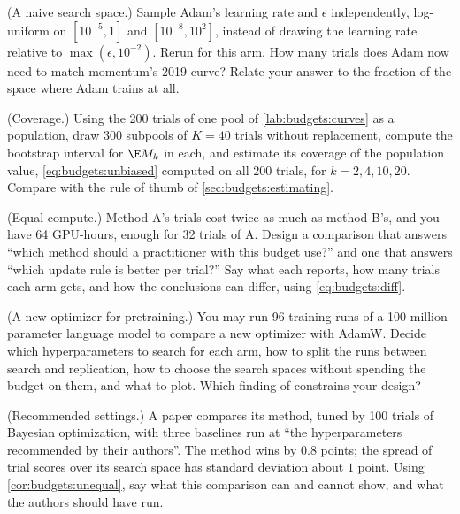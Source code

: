 \begin{refsection}
\begin{exercises}
\item \labwork (A naive search space.) Sample Adam's learning rate and $\epsilon$ independently, log-uniform on $[10^{-5},1]$ and $[10^{-8},10^2]$, instead of drawing the learning rate relative to $\max(\epsilon,10^{-2})$. Rerun  for this arm. How many trials does Adam now need to match momentum's 2019 curve? Relate your answer to the fraction of the space where Adam trains at all.\label{ex:budgets:naive}

\item \labwork (Coverage.) Using the 200 trials of one pool of \cref{lab:budgets:curves} as a population, draw 300 subpools of $K=40$ trials without replacement, compute the bootstrap interval for $\E M_k$ in each, and estimate its coverage of the population value, \eqref{eq:budgets:unbiased} computed on all 200 trials, for $k=2,4,10,20$. Compare with the rule of thumb of \cref{sec:budgets:estimating}.\label{ex:budgets:coverage}

\item \design (Equal compute.) Method A's trials cost twice as much as method B's, and you have 64 GPU-hours, enough for 32 trials of A. Design a comparison that answers \enquote{which method should a practitioner with this budget use?} and one that answers \enquote{which update rule is better per trial?} Say what each reports, how many trials each arm gets, and how the conclusions can differ, using \eqref{eq:budgets:diff}.\label{ex:budgets:compute}

\item \design (A new optimizer for pretraining.) You may run 96 training runs of a 100-million-parameter language model to compare a new optimizer with AdamW. Decide which hyperparameters to search for each arm, how to split the runs between search and replication, how to choose the search spaces without spending the budget on them, and what to plot. Which finding of \textcite{WenEtAl2026} constrains your design?\label{ex:budgets:pretraining}

\item \critique (Recommended settings.) A paper compares its method, tuned by 100 trials of Bayesian optimization, with three baselines run at \enquote{the hyperparameters recommended by their authors}. The method wins by $0.8$ points; the spread of trial scores over its search space has standard deviation about $1$ point. Using \cref{cor:budgets:unequal}, say what this comparison can and cannot show, and what the authors should have run.\label{ex:budgets:recommended}


\end{exercises}
\end{refsection}
